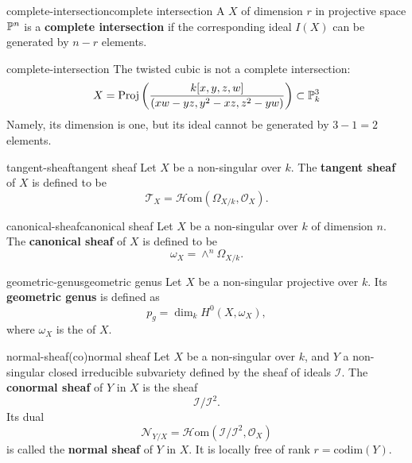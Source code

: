 \begin{topic}{complete-intersection}{complete intersection}
    A  $X$ of dimension $r$ in projective space $\mathbb{P}^n$ is a \textbf{complete intersection} if the corresponding ideal $I(X)$ can be generated by $n - r$ elements.
\end{topic}

\begin{example}{complete-intersection}
    The twisted cubic is not a complete intersection:
    \[ X = \text{Proj}\left(\frac{k[x, y, z, w]}{(xw - yz, y^2 - xz, z^2 - yw)}\right) \subset \mathbb{P}_k^3 \]
    Namely, its dimension is one, but its ideal cannot be generated by $3 - 1 = 2$ elements.
\end{example}

\begin{topic}{tangent-sheaf}{tangent sheaf}
    Let $X$ be a non-singular  over $k$. The \textbf{tangent sheaf} of $X$ is defined to be
    \[ \mathcal{T}_X = \mathcal{H}\text{om}(\Omega_{X/k}, \mathcal{O}_X) . \]
\end{topic}

\begin{topic}{canonical-sheaf}{canonical sheaf}
    Let $X$ be a non-singular  over $k$ of dimension $n$. The \textbf{canonical sheaf} of $X$ is defined to be
    \[ \omega_X = \wedge^n \Omega_{X/k} . \]
\end{topic}

\begin{topic}{geometric-genus}{geometric genus}
    Let $X$ be a non-singular projective  over $k$. Its \textbf{geometric genus} is defined as
    \[ p_g = \dim_k H^0(X, \omega_X) , \]
    where $\omega_X$ is the  of $X$.
\end{topic}

\begin{topic}{normal-sheaf}{(co)normal sheaf}
    Let $X$ be a non-singular  over $k$, and $Y$ a non-singular closed irreducible subvariety defined by the sheaf of ideals $\mathcal{I}$. The \textbf{conormal sheaf} of $Y$ in $X$ is the sheaf
    \[ \mathcal{I}/\mathcal{I}^2 . \]
    Its dual
    \[ \mathcal{N}_{Y/X} = \mathcal{H}\text{om}(\mathcal{I}/\mathcal{I}^2, \mathcal{O}_X) \]
    is called the \textbf{normal sheaf} of $Y$ in $X$. It is locally free of rank $r = \text{codim}(Y)$.
\end{topic}

